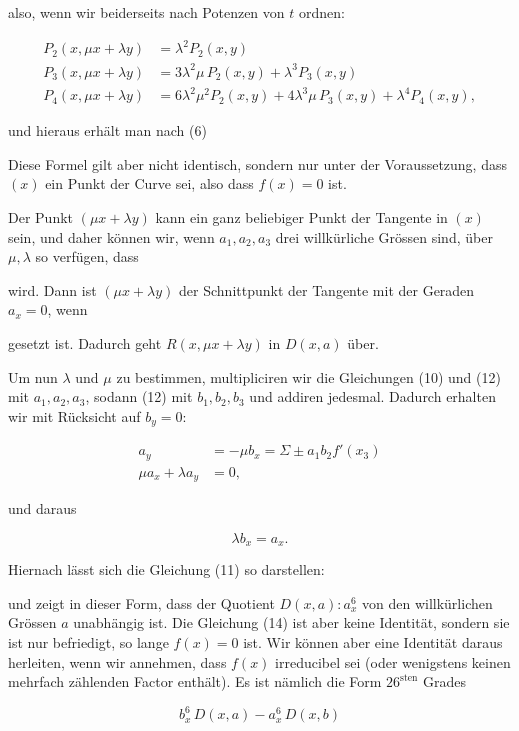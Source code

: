 also, wenn wir beiderseits nach Potenzen von $t$ ordnen:

\[
\begin{aligned}
P_2(x,\mu x + \lambda y) &= \lambda^2 P_2(x,y)\\
P_3(x,\mu x + \lambda y) &= 3\lambda^2\mu\, P_2(x,y) + \lambda^3 P_3(x,y)\\
P_4(x,\mu x + \lambda y) &= 6\lambda^2\mu^2 P_2(x,y) + 4\lambda^3\mu\, P_3(x,y) + \lambda^4 P_4(x,y),
\end{aligned}
\]

und hieraus erhält man nach (6)


Diese Formel gilt aber nicht identisch, sondern nur unter der Voraussetzung, dass $(x)$ ein Punkt der Curve sei, also dass $f(x) = 0$ ist.

Der Punkt $(\mu x+\lambda y)$ kann ein ganz beliebiger Punkt der Tangente in $(x)$ sein, und daher können wir, wenn $a_1, a_2, a_3$ drei willkürliche Grössen sind, über $\mu, \lambda$ so verfügen, dass


wird. Dann ist $(\mu x+\lambda y)$ der Schnittpunkt der Tangente mit der Geraden $a_x = 0$, wenn


gesetzt ist. Dadurch geht $R(x,\mu x+\lambda y)$ in $D(x,a)$ über.

Um nun $\lambda$ und $\mu$ zu bestimmen, multipliciren wir die Gleichungen (10) und (12) mit $a_1, a_2, a_3$, sodann (12) mit $b_1, b_2, b_3$ und addiren jedesmal. Dadurch erhalten wir mit Rücksicht auf $b_y = 0$:

\[
\begin{aligned}
a_y &= -\mu b_x = \Sigma \pm a_1 b_2 f'(x_3)\\
\mu a_x + \lambda a_y &= 0,
\end{aligned}
\]

und daraus

\[
\lambda b_x = a_x.
\]

Hiernach lässt sich die Gleichung (11) so darstellen:


und zeigt in dieser Form, dass der Quotient $D(x,a) : a_x^6$ von den willkürlichen Grössen $a$ unabhängig ist. Die Gleichung (14) ist aber keine Identität, sondern sie ist nur befriedigt, so lange $f(x) = 0$ ist. Wir können aber eine Identität daraus herleiten, wenn wir annehmen, dass $f(x)$ irreducibel sei (oder wenigstens keinen mehrfach zählenden Factor enthält). Es ist nämlich die Form $26^{\text{sten}}$ Grades

\[
b_x^6\, D(x,a) - a_x^6\, D(x,b)
\]
